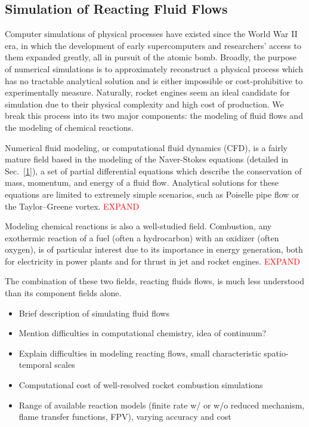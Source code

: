 \subsection{Simulation of Reacting Fluid Flows}

Computer simulations of physical processes have existed since the World War II era, in which the development of early supercomputers and researchers' access to them expanded greatly, all in pursuit of the atomic bomb. Broadly, the purpose of numerical simulations is to approximately reconstruct a physical process which has no tractable analytical solution and is either impossible or cost-prohibitive to experimentally measure. Naturally, rocket engines seem an ideal candidate for simulation due to their physical complexity and high cost of production. We break this process into its two major components: the modeling of fluid flows and the modeling of chemical reactions.

Numerical fluid modeling, or computational fluid dynamics (CFD), is a fairly mature field based in the modeling of the Naver-Stokes equations (detailed in Sec.~\ref{1}), a set of partial differential equations which describe the conservation of mass, momentum, and energy of a fluid flow. Analytical solutions for these equations are limited to extremely simple scenarios, such as Poiselle pipe flow or the Taylor--Greene vortex. \textcolor{red}{EXPAND}

Modeling chemical reactions is also a well-studied field. Combustion, any exothermic reaction of a fuel (often a hydrocarbon) with an oxidizer (often oxygen), is of particular interest due to its importance in energy generation, both for electricity in power plants and for thrust in jet and rocket engines. \textcolor{red}{EXPAND}

The combination of these two fields, reacting fluids flows, is much less understood than its component fields alone.

\begin{itemize}
    \item Brief description of simulating fluid flows
    \item Mention difficulties in computational chemistry, idea of continuum?
    \item Explain difficulties in modeling reacting flows, small characteristic spatio-temporal scales
    \item Computational cost of well-resolved rocket combustion simulations
    \item Range of available reaction models (finite rate w/ or w/o reduced mechanism, flame transfer functions, FPV), varying accuracy and cost
\end{itemize}